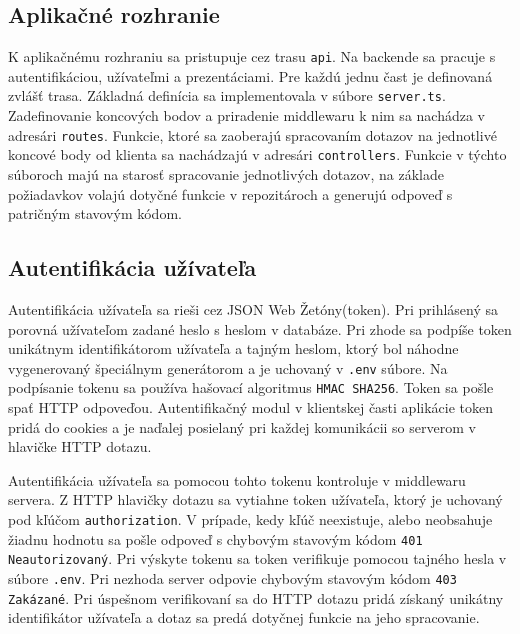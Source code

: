 \subsection{Aplikačné rozhranie}
K aplikačnému rozhraniu sa pristupuje cez trasu \texttt{api}. Na backende sa pracuje s autentifikáciou, užívateľmi a prezentáciami. Pre každú jednu čast je definovaná zvlášť trasa. Základná definícia sa implementovala v súbore \texttt{server.ts}. Zadefinovanie koncových bodov a priradenie middlewaru k nim sa nachádza v adresári \texttt{routes}. Funkcie, ktoré sa zaoberajú spracovaním dotazov na jednotlivé koncové body od klienta sa nachádzajú v adresári \texttt{controllers}. Funkcie v týchto súboroch majú na starosť spracovanie jednotlivých dotazov, na základe požiadavkov volajú dotyčné funkcie v repozitároch a generujú odpoveď s patričným stavovým kódom.

\subsection{Autentifikácia užívateľa}
Autentifikácia užívateľa sa rieši cez JSON Web Žetóny(token). Pri prihlásený sa porovná užívateľom zadané heslo s heslom v databáze. Pri zhode sa podpíše token unikátnym identifikátorom užívateľa a tajným heslom, ktorý bol náhodne vygenerovaný špeciálnym generátorom a je uchovaný v \texttt{.env} súbore. Na podpísanie tokenu sa používa hašovací algoritmus \texttt{HMAC SHA256}.
Token sa pošle spať HTTP odpoveďou. Autentifikačný modul v klientskej časti aplikácie token pridá do cookies a je naďalej posielaný pri každej komunikácii so serverom v hlavičke HTTP dotazu.

Autentifikácia užívateľa sa pomocou tohto tokenu kontroluje v middlewaru servera. Z HTTP hlavičky dotazu sa vytiahne token užívateľa, ktorý je uchovaný pod kľúčom \texttt{authorization}. V prípade, kedy kľúč neexistuje, alebo neobsahuje žiadnu hodnotu sa pošle odpoveď s chybovým stavovým kódom \texttt{401 Neautorizovaný}. Pri výskyte tokenu sa token verifikuje pomocou tajného hesla v súbore \texttt{.env}. Pri nezhoda server odpovie chybovým stavovým kódom \texttt{403 Zakázané}. Pri úspešnom verifikovaní sa do HTTP dotazu pridá získaný unikátny identifikátor užívateľa a dotaz sa predá dotyčnej funkcie na jeho spracovanie.